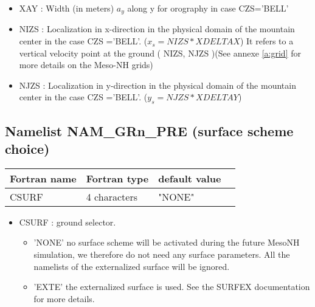 \begin{itemize}
\item   XAY  :  Width  (in meters)
$a_{y}$ along y  for orography in case CZS='BELL'

\item  NIZS :  Localization in x-direction in the physical domain of the mountain center in 
the  case CZS ='BELL'. ($x_{s} = NIZS * XDELTAX$) It refers to a vertical
velocity point at the ground ( NIZS, NJZS )(See annexe \ref{a:grid} for more details on the Meso-NH grids)

\item   NJZS : Localization in y-direction in the physical domain of the mountain center in 
 the     case CZS ='BELL'. ($y_{s} = NJZS * XDELTAY$)

\end{itemize}


\subsection{Namelist NAM\_GRn\_PRE (surface scheme choice)}

\begin{center}
\begin{tabular} {|l|l|l|l|}
\hline
Fortran name & Fortran type & default value \\
\hline
\hline
CSURF    & 4 characters   &  "NONE"  \\
\hline
\end{tabular}
\end{center}

\begin{itemize}

\item
CSURF : ground selector.

\begin{itemize}
\item 'NONE' no surface scheme will be activated during the future MesoNH
simulation, we therefore do not need any surface parameters. All the namelists of the externalized surface will be ignored.

\item 'EXTE' the externalized surface is used. See the SURFEX documentation for more details.
\end{itemize}  

\end{itemize}  


